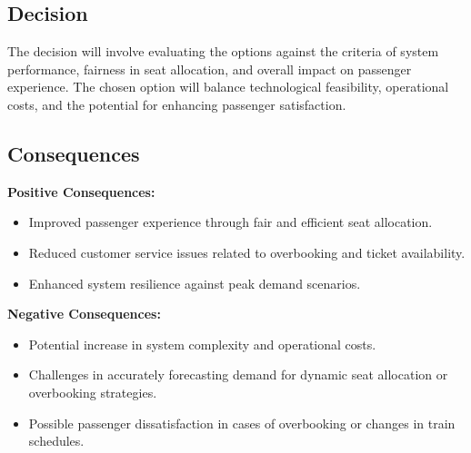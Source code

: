 \subsection*{Decision}
The decision will involve evaluating the options against the criteria of system performance, fairness in seat allocation, and overall impact on passenger experience. The chosen option will balance technological feasibility, operational costs, and the potential for enhancing passenger satisfaction.

\subsection*{Consequences}
\textbf{Positive Consequences:}
\begin{itemize}
    \item Improved passenger experience through fair and efficient seat allocation.
    \item Reduced customer service issues related to overbooking and ticket availability.
    \item Enhanced system resilience against peak demand scenarios.
\end{itemize}
\textbf{Negative Consequences:}
\begin{itemize}
    \item Potential increase in system complexity and operational costs.
    \item Challenges in accurately forecasting demand for dynamic seat allocation or overbooking strategies.
    \item Possible passenger dissatisfaction in cases of overbooking or changes in train schedules.
\end{itemize}
